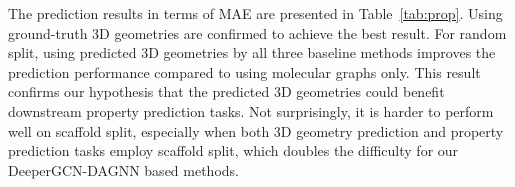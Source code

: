 \documentclass{article}
\begin{document}
\begin{table}[t]
    \small
    \caption{MAE performance on predicting the HOMO-LUMO gap using different inputs. Experiments are conducted with both provided split types. The best results are highlighted in bold numbers.}
    \center
    \label{tab:prop}
\end{table}





The prediction results in terms of MAE are presented in Table~\ref{tab:prop}. Using ground-truth 3D geometries are confirmed to achieve the best result. For random split, using predicted 3D geometries by all three baseline methods improves the prediction performance compared to using molecular graphs only. This result confirms our hypothesis that the predicted 3D geometries could benefit downstream property prediction tasks. Not surprisingly, it is harder to perform well on scaffold split, especially when both 3D geometry prediction and property prediction tasks employ scaffold split, which doubles the difficulty for our DeeperGCN-DAGNN based methods. 
\end{document}
